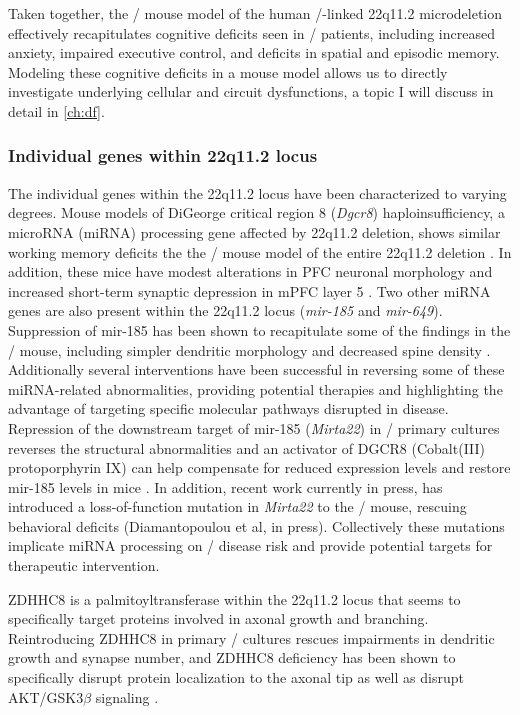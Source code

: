 Taken together, the \df/ mouse model of the human \scz/-linked 22q11.2 microdeletion effectively recapitulates cognitive deficits seen in \scz/ patients, including increased anxiety, impaired executive control, and deficits in spatial and episodic memory.
Modeling these cognitive deficits in a mouse model allows us to directly investigate underlying cellular and circuit dysfunctions, a topic I will discuss in detail in \autoref{ch:df}.

\subsubsection{Individual genes within 22q11.2 locus}
The individual genes within the 22q11.2 locus have been characterized to varying degrees.
Mouse models of DiGeorge critical region 8 (\emph{Dgcr8}) haploinsufficiency, a microRNA (miRNA) processing gene affected by 22q11.2 deletion, shows similar working memory deficits the the \df/ mouse model of the entire 22q11.2 deletion \citep{Stark2008}.
In addition, these mice have modest alterations in \ac{PFC} neuronal morphology and increased short-term synaptic depression in mPFC layer 5 \citep{Fenelon2011}.
Two other miRNA genes are also present within the 22q11.2 locus (\emph{mir-185} and \emph{mir-649}).
Suppression of mir-185 has been shown to recapitulate some of the findings in the \df/ mouse, including simpler dendritic morphology and decreased spine density \citep{Xu2013a}.
Additionally several interventions have been successful in reversing some of these miRNA-related abnormalities, providing potential therapies and highlighting the advantage of targeting specific molecular pathways disrupted in disease.
Repression of the downstream target of mir-185 (\emph{Mirta22}) in \df/ primary cultures reverses the structural abnormalities \citep{Xu2013a} and an activator of DGCR8 (Cobalt(III) protoporphyrin IX) can help compensate for reduced expression levels and restore mir-185 levels in mice \citep{Barr2015}.
In addition, recent work currently in press, has introduced a loss-of-function mutation in \emph{Mirta22} to the \df/ mouse, rescuing behavioral deficits (Diamantopoulou et al, in press).
Collectively these mutations implicate miRNA processing on \scz/ disease risk and provide potential targets for therapeutic intervention.

ZDHHC8 is a palmitoyltransferase within the 22q11.2 locus that seems to specifically target proteins involved in axonal growth and branching.
Reintroducing ZDHHC8 in primary \df/ cultures rescues impairments in dendritic growth and synapse number, and ZDHHC8 deficiency has been shown to specifically disrupt protein localization to the axonal tip as well as disrupt AKT/GSK3$\beta$ signaling \citep{Mukai2008, Mukai2015}.


